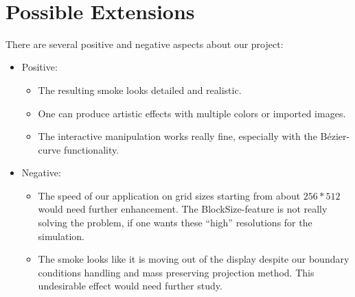 \documentclass[a4paper,10pt,oneside,final,german,openbib,pdftex,titlepage]{scrbook}
\begin{document}
\begin{figure}[H]
{ \label{diffusionDemo}
}
\\
\end{figure}
%
%
\chapter{Possible Extensions}

There are several positive and negative aspects about our project:
\begin{itemize}
\item Positive:
\begin{itemize}
\item The resulting smoke looks detailed and realistic.
\item One can produce artistic effects with multiple colors or imported images.
\item The interactive manipulation works really fine, especially with the Bézier-curve functionality.
\end{itemize}
\item Negative:
\begin{itemize}
\item The speed of our application on grid sizes starting from about $256*512$ would need further enhancement. The BlockSize-feature is not really solving the problem, if one wants these ``high'' resolutions for the simulation.
\item The smoke looks like it is moving out of the display despite our boundary conditions handling and mass preserving projection method. This undesirable effect would need further study.
\end{itemize}
\end{itemize}
\end{document}
